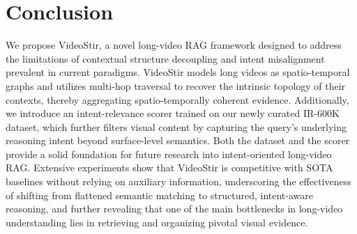 
\section{Conclusion}
We propose VideoStir, a novel long-video RAG framework designed to address the limitations of contextual structure decoupling and intent misalignment prevalent in current paradigms. VideoStir models long videos as spatio-temporal graphs and utilizes multi-hop traversal to recover the intrinsic topology of their contexts, thereby aggregating spatio-temporally coherent evidence. Additionally, we introduce an intent-relevance scorer trained on our newly curated IR-600K dataset, which further filters visual content by capturing the query's underlying reasoning intent beyond surface-level semantics. Both the dataset and the scorer provide a solid foundation for future research into intent-oriented long-video RAG. Extensive experiments show that VideoStir is competitive with SOTA baselines without relying on auxiliary information, underscoring the effectiveness of shifting from flattened semantic matching to structured, intent-aware reasoning, and further revealing that one of the main bottlenecks in long-video understanding lies in retrieving and organizing pivotal visual evidence.

